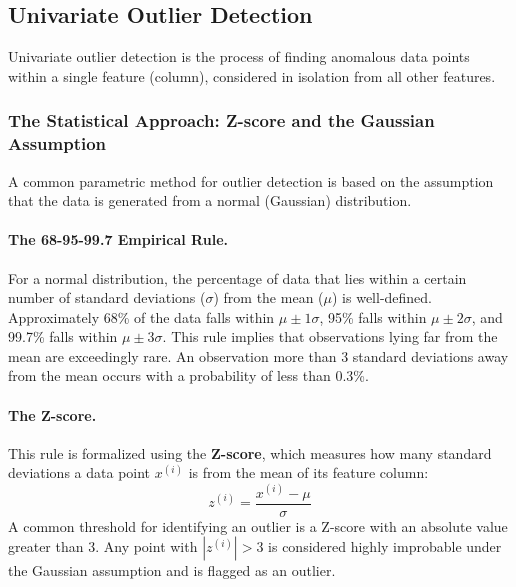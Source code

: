\begin{itemize}
\subsection{Univariate Outlier Detection}
\label{subsec:univariate_outliers}
Univariate outlier detection is the process of finding anomalous data points within a single feature (column), considered in isolation from all other features.

\subsubsection{The Statistical Approach: Z-score and the Gaussian Assumption}
A common parametric method for outlier detection is based on the assumption that the data is generated from a normal (Gaussian) distribution.

\paragraph{The 68-95-99.7 Empirical Rule.} For a normal distribution, the percentage of data that lies within a certain number of standard deviations ($\sigma$) from the mean ($\mu$) is well-defined. Approximately 68\% of the data falls within $\mu \pm 1\sigma$, 95\% falls within $\mu \pm 2\sigma$, and 99.7\% falls within $\mu \pm 3\sigma$. This rule implies that observations lying far from the mean are exceedingly rare. An observation more than 3 standard deviations away from the mean occurs with a probability of less than 0.3\%.

\paragraph{The Z-score.} This rule is formalized using the \textbf{Z-score}, which measures how many standard deviations a data point $x^{(i)}$ is from the mean of its feature column:
$$ z^{(i)} = \frac{x^{(i)} - \mu}{\sigma} $$
A common threshold for identifying an outlier is a Z-score with an absolute value greater than 3. Any point with $|z^{(i)}| > 3$ is considered highly improbable under the Gaussian assumption and is flagged as an outlier.


\end{itemize}
